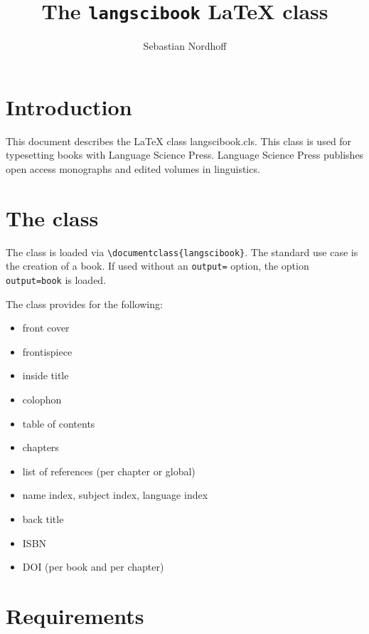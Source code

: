 \documentclass[output=guidelines]{langscibook}
\author{Sebastian Nordhoff}
\title{The \texttt{langscibook} {\LaTeX} class}
\subtitle{}
\begin{document}
\maketitle

\frontmatter
{} %
\tableofcontents
% 
% 
% 

\mainmatter
\chapter{Introduction}
This document describes the {\LaTeX} class langscibook.cls. This class is used for typesetting books with Language Science Press. Language Science Press publishes open access monographs and edited volumes in linguistics.


\chapter{The class}
The class is loaded via \verb+\documentclass{langscibook}+. The standard use case is the creation of a book. If used without an \texttt{output=} option, the option \texttt{output=book} is loaded.

The class provides for the following:
\begin{itemize}
 \item front cover
 \item frontispiece
 \item inside title
 \item colophon
 \item table of contents
 \item chapters
 \item list of references (per chapter or global)
 \item name index, subject index, language index
 \item back title
 \item ISBN
 \item DOI (per book and per chapter)
\end{itemize}


\chapter{Requirements}
\end{document}
